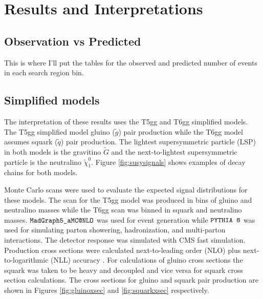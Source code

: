 \chapter{Results and Interpretations}

\section{Observation vs Predicted}
This is where I'll put the tables for the observed and predicted number of events in each search region bin.

\section{Simplified models}
The interpretation of these results uses the T5gg and T6gg simplified models.  The T5gg simplified model gluino ($\tilde{g}$) pair production while the T6gg model assumes squark ($\tilde{q}$) pair production. The lightest supersymmetric particle (LSP) in both models is the gravitino $\tilde{G}$ and the next-to-lightest supersymmetric particle is the neutralino $\tilde{\chi}^{0}_{1}$.  Figure \ref{fig:susysignals} shows examples of decay chains for both models.  

Monte Carlo scans were used to evaluate the expected signal distributions for these models.  The scan for the T5gg model was produced in bins of gluino and neutralino masses while the T6gg scan was binned in squark and neutralino masses.  $\verb|MadGraph5_aMC@NLO|$ was used for event generation\cite{Alwall:2014hca} while $\verb|PYTHIA 8|$ was used for simulating parton showering, hadronization, and multi-parton interactions\cite{Sjostrand:2007gs}.  The detector response was simulated with CMS fast simulation\cite{Abdullin:2011zz}.  Production cross sections were calculated next-to-leading order (NLO) plus next-to-logarithmic (NLL) accuracy \cite{Borschensky:2014cia}.  For calculations of gluino cross sections the squark was taken to be heavy and decoupled and vice versa for squark cross section calculations.  The cross sections for gluino and squark pair production are shown in Figures \ref{fig:gluinoxsec} and \ref{fig:squarkxsec} respectively.

